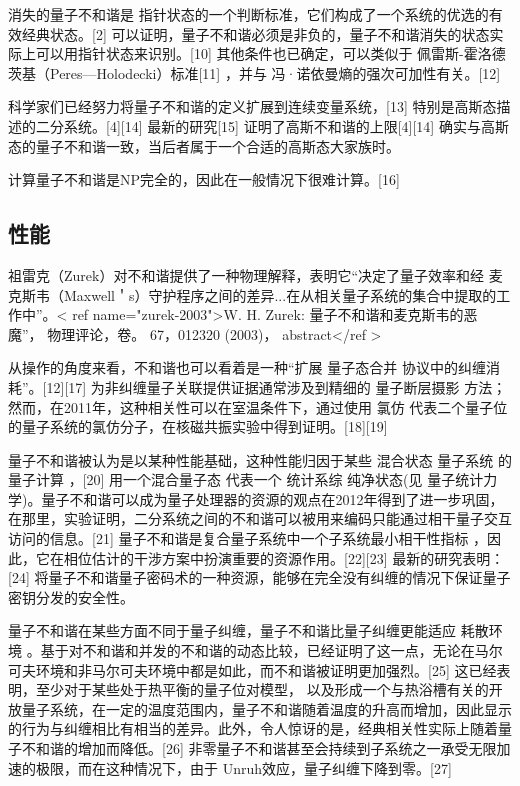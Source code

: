 消失的量子不和谐是 指针状态的一个判断标准，它们构成了一个系统的优选的有效经典状态。[2] 可以证明，量子不和谐必须是非负的，量子不和谐消失的状态实际上可以用指针状态来识别。[10] 其他条件也已确定，可以类似于 佩雷斯-霍洛德茨基（Peres—Holodecki）标准[11] ，并与 冯·诺依曼熵的强次可加性有关。[12]

科学家们已经努力将量子不和谐的定义扩展到连续变量系统，[13] 特别是高斯态描述的二分系统。[4][14] 最新的研究[15] 证明了高斯不和谐的上限[4][14] 确实与高斯态的量子不和谐一致，当后者属于一个合适的高斯态大家族时。

计算量子不和谐是NP完全的，因此在一般情况下很难计算。[16]

\subsection{性能}
祖雷克（Zurek）对不和谐提供了一种物理解释，表明它“决定了量子效率和经 麦克斯韦（Maxwell＇s）守护程序之间的差异...在从相关量子系统的集合中提取的工作中”。< ref name="zurek-2003">W. H. Zurek: 量子不和谐和麦克斯韦的恶魔”， 物理评论，卷。 67，012320 (2003)， abstract</ref >

从操作的角度来看，不和谐也可以看着是一种“扩展 量子态合并 协议中的纠缠消耗”。[12][17] 为非纠缠量子关联提供证据通常涉及到精细的 量子断层摄影 方法；然而，在2011年，这种相关性可以在室温条件下，通过使用 氯仿 代表二个量子位的量子系统的氯仿分子，在核磁共振实验中得到证明。[18][19]

量子不和谐被认为是以某种性能基础，这种性能归因于某些 混合状态 量子系统 的量子计算 ，[20] 用一个混合量子态 代表一个 统计系综 纯净状态(见 量子统计力学)。量子不和谐可以成为量子处理器的资源的观点在2012年得到了进一步巩固，在那里，实验证明，二分系统之间的不和谐可以被用来编码只能通过相干量子交互访问的信息。[21] 量子不和谐是复合量子系统中一个子系统最小相干性指标 ，因此，它在相位估计的干涉方案中扮演重要的资源作用。[22][23] 最新的研究表明：[24] 将量子不和谐量子密码术的一种资源，能够在完全没有纠缠的情况下保证量子密钥分发的安全性。

量子不和谐在某些方面不同于量子纠缠，量子不和谐比量子纠缠更能适应 耗散环境 。基于对不和谐和并发的不和谐的动态比较，已经证明了这一点，无论在马尔可夫环境和非马尔可夫环境中都是如此，而不和谐被证明更加强烈。[25] 这已经表明，至少对于某些处于热平衡的量子位对模型， 以及形成一个与热浴槽有关的开放量子系统，在一定的温度范围内，量子不和谐随着温度的升高而增加，因此显示的行为与纠缠相比有相当的差异。此外，令人惊讶的是，经典相关性实际上随着量子不和谐的增加而降低。[26] 非零量子不和谐甚至会持续到子系统之一承受无限加速的极限，而在这种情况下，由于 Unruh效应，量子纠缠下降到零。[27]

